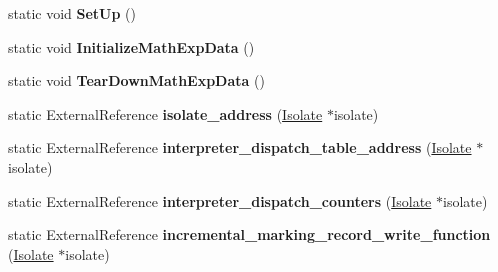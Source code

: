 \begin{DoxyCompactItemize}
\item 
static void {\bfseries Set\+Up} ()\hypertarget{classv8_1_1internal_1_1_b_a_s_e___e_m_b_e_d_d_e_d_a46f636a6070e22e1fb9494ed661a225e}{}\label{classv8_1_1internal_1_1_b_a_s_e___e_m_b_e_d_d_e_d_a46f636a6070e22e1fb9494ed661a225e}

\item 
static void {\bfseries Initialize\+Math\+Exp\+Data} ()\hypertarget{classv8_1_1internal_1_1_b_a_s_e___e_m_b_e_d_d_e_d_a41e93b2480309de4ea6359b4df8e47ff}{}\label{classv8_1_1internal_1_1_b_a_s_e___e_m_b_e_d_d_e_d_a41e93b2480309de4ea6359b4df8e47ff}

\item 
static void {\bfseries Tear\+Down\+Math\+Exp\+Data} ()\hypertarget{classv8_1_1internal_1_1_b_a_s_e___e_m_b_e_d_d_e_d_a081df33a6c9a501ba082a18220222842}{}\label{classv8_1_1internal_1_1_b_a_s_e___e_m_b_e_d_d_e_d_a081df33a6c9a501ba082a18220222842}

\item 
static External\+Reference {\bfseries isolate\+\_\+address} (\hyperlink{classv8_1_1internal_1_1_isolate}{Isolate} $\ast$isolate)\hypertarget{classv8_1_1internal_1_1_b_a_s_e___e_m_b_e_d_d_e_d_a74426835d7b8300d45e9098bd3d0b8c8}{}\label{classv8_1_1internal_1_1_b_a_s_e___e_m_b_e_d_d_e_d_a74426835d7b8300d45e9098bd3d0b8c8}

\item 
static External\+Reference {\bfseries interpreter\+\_\+dispatch\+\_\+table\+\_\+address} (\hyperlink{classv8_1_1internal_1_1_isolate}{Isolate} $\ast$isolate)\hypertarget{classv8_1_1internal_1_1_b_a_s_e___e_m_b_e_d_d_e_d_ac41b295eb113cacd14ead5755a3147a4}{}\label{classv8_1_1internal_1_1_b_a_s_e___e_m_b_e_d_d_e_d_ac41b295eb113cacd14ead5755a3147a4}

\item 
static External\+Reference {\bfseries interpreter\+\_\+dispatch\+\_\+counters} (\hyperlink{classv8_1_1internal_1_1_isolate}{Isolate} $\ast$isolate)\hypertarget{classv8_1_1internal_1_1_b_a_s_e___e_m_b_e_d_d_e_d_a33b907e63263b10c5462d0f668232209}{}\label{classv8_1_1internal_1_1_b_a_s_e___e_m_b_e_d_d_e_d_a33b907e63263b10c5462d0f668232209}

\item 
static External\+Reference {\bfseries incremental\+\_\+marking\+\_\+record\+\_\+write\+\_\+function} (\hyperlink{classv8_1_1internal_1_1_isolate}{Isolate} $\ast$isolate)\hypertarget{classv8_1_1internal_1_1_b_a_s_e___e_m_b_e_d_d_e_d_a9830362f83992da5b14b21692af6e216}{}\label{classv8_1_1internal_1_1_b_a_s_e___e_m_b_e_d_d_e_d_a9830362f83992da5b14b21692af6e216}


\end{DoxyCompactItemize}

